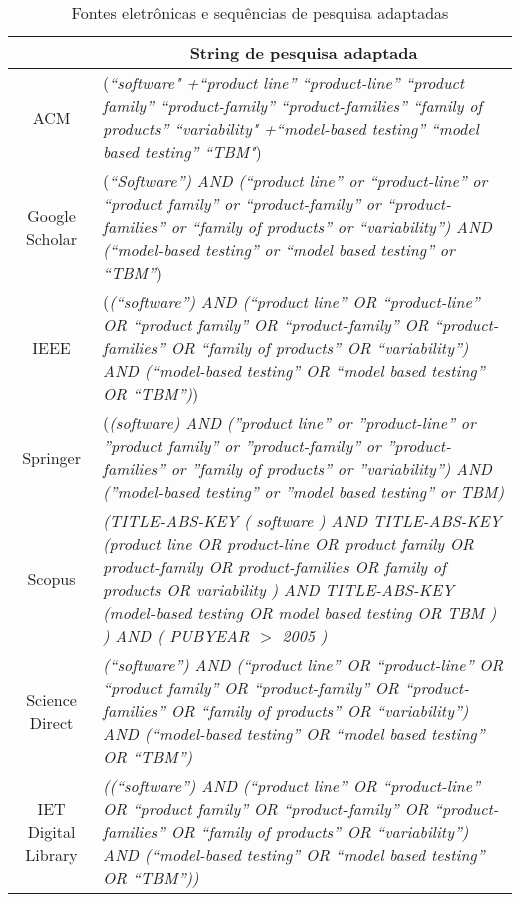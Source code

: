 \begin{table}[ht]
	\centering
	\scriptsize
	\caption{Fontes eletrônicas e sequências de pesquisa adaptadas}
	\label{tab:string_sources}
	\begin{tabularx}{\columnwidth}{c|X} 
		\hline \hline
		\textbf{\begin{tabular}[c]{@{}c@{}}Fonte Eletrônica\end{tabular}} & \multicolumn{1}{c}{\textbf{String de pesquisa adaptada}} \\\hline \hline
		
		ACM &  (\textit{``software" +``product line'' ``product-line'' ``product family'' ``product-family'' ``product-families''	``family of products'' ``variability" +``model-based testing'' ``model based testing'' ``TBM"}) \\\hline
		
		Google Scholar &  (\textit{``Software'') AND (``product line'' or ``product-line'' or ``product family'' or ``product-family'' or ``product-families'' or ``family of products'' or ``variability'') AND (``model-based testing'' or ``model based testing'' or ``TBM''}) \\\hline
		
		IEEE &  (\textit{(``software'') AND (``product line'' OR ``product-line'' OR ``product family'' OR ``product-family'' OR ``product-families'' OR ``family of products'' OR ``variability'') AND (``model-based testing'' OR ``model based testing'' OR ``TBM'')}) \\\hline
		
		Springer &  (\textit{(software)  AND  (''product line'' or ''product-line'' or ''product family'' or ''product-family'' or ''product-families'' or ''family of products'' or ''variability'')  AND  (''model-based testing'' or ''model based testing'' or TBM)} \\\hline
		
		Scopus & \textit{(TITLE-ABS-KEY ( software )  AND  TITLE-ABS-KEY ({product line}  OR {product-line}  OR {product family}  OR {product-family}  OR {product-families}  OR {family of products}  OR {variability} )  AND  TITLE-ABS-KEY ({model-based testing}  OR {model based testing}  OR {TBM} ) )  AND  ( PUBYEAR  $>$  2005 ) } \\\hline
		
		Science Direct & \textit{(``software'') AND (``product line'' OR ``product-line'' OR ``product family'' OR ``product-family'' OR ``product-families'' OR ``family of products'' OR ``variability'') AND (``model-based testing'' OR ``model based testing'' OR ``TBM'')} \\\hline
		
		IET Digital Library & \textit{((``software'') AND (``product line'' OR ``product-line'' OR ``product family'' OR ``product-family'' OR ``product-families'' OR ``family of products'' OR ``variability'') AND (``model-based testing'' OR ``model based testing'' OR ``TBM''))} \\\hline			
		\hline 
	\end{tabularx}	
\end{table}

